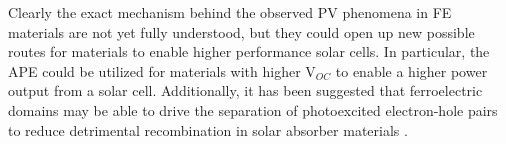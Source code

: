 Clearly the exact mechanism behind the observed PV phenomena in FE materials are not yet fully understood, but they could open up new possible routes for materials to enable higher performance solar cells. In particular, the APE could be utilized for materials with higher V$_{OC}$ to enable a higher power output from a solar cell. Additionally, it has been suggested that ferroelectric domains may be able to drive the separation of photoexcited electron-hole pairs to reduce detrimental recombination in solar absorber materials \cite{Jarv}. 